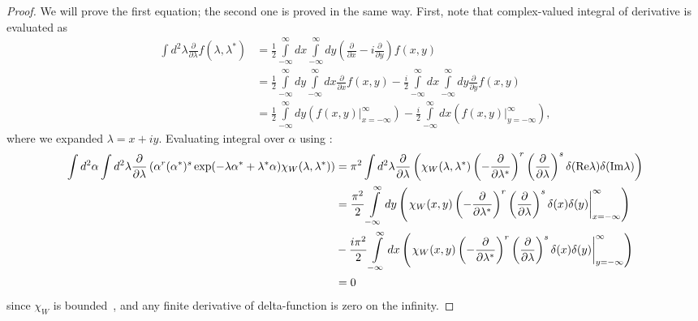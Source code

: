\begin{proof}
We will prove the first equation; the second one is proved in the same way.
First, note that complex-valued integral of derivative is evaluated as
\begin{equation*}
\begin{split}
	\int d^2\lambda \frac{\partial}{\partial \lambda} f(\lambda, \lambda^*)
	& = \frac{1}{2} \int\limits_{-\infty}^{\infty} dx \int\limits_{-\infty}^{\infty} dy
		\left( \frac{\partial}{\partial x} - i \frac{\partial}{\partial y} \right)
		f(x, y) \\
	& = \frac{1}{2} \int\limits_{-\infty}^{\infty} dy \int\limits_{-\infty}^{\infty} dx
			\frac{\partial}{\partial x} f(x, y)
		- \frac{i}{2} \int\limits_{-\infty}^{\infty} dx \int\limits_{-\infty}^{\infty} dy
			\frac{\partial}{\partial y} f(x, y) \\
	& =	\frac{1}{2} \int\limits_{-\infty}^{\infty} dy \left(
			\left. f(x, y) \right|_{x=-\infty}^{\infty}
		\right)
		- \frac{i}{2} \int\limits_{-\infty}^{\infty} dx \left(
			\left. f(x, y) \right|_{y=-\infty}^{\infty}
		\right),
\end{split}
\end{equation*}
where we expanded $\lambda = x + iy$.
Evaluating integral over $\alpha$ using :
\begin{equation*}
\begin{split}
	\int d^2\alpha \int d^2\lambda
		\frac{\partial}{\partial \lambda} \left(
			\alpha^r (\alpha^*)^s \exp(-\lambda \alpha^* + \lambda^* \alpha) \chi_W (\lambda, \lambda^*)
		\right)
	& = \pi^2 \int d^2\lambda
		\frac{\partial}{\partial \lambda} \left(
			\chi_W (\lambda, \lambda^*)
			\left( -\frac{\partial}{\partial \lambda^*} \right)^r
			\left( \frac{\partial}{\partial \lambda} \right)^s
			\delta(\mathrm{Re} \lambda) \delta(\mathrm{Im} \lambda)
		\right) \\
	& = \frac{\pi^2}{2} \int\limits_{-\infty}^{\infty} dy \left(
		\left.
			\chi_W (x, y)
			\left( -\frac{\partial}{\partial \lambda^*} \right)^r
			\left( \frac{\partial}{\partial \lambda} \right)^s
			\delta(x) \delta(y)
		\right|_{x=-\infty}^{\infty}
	\right) \\
	& - \frac{i\pi^2}{2} \int\limits_{-\infty}^{\infty} dx \left(
		\left.
			\chi_W (x, y)
			\left( -\frac{\partial}{\partial \lambda^*} \right)^r
			\left( \frac{\partial}{\partial \lambda} \right)^s
			\delta(x) \delta(y)
		\right|_{y=-\infty}^{\infty}
	\right) \\
	& = 0
\end{split}
\end{equation*}
since $\chi_W$ is bounded~\cite{Gardiner2004},
and any finite derivative of delta-function is zero on the infinity.
\end{proof}


